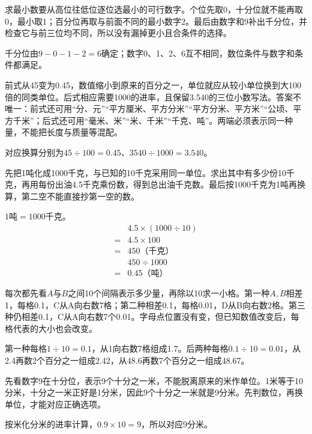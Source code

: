 \documentclass[multi=snippet,border=0pt]{standalone}
\newenvironment{snippet}[3]{\begin{minipage}{#1bp}\color{answerred}\fontsize{#2}{#3}\selectfont\raggedright}{\end{minipage}}
\begin{document}
\begin{snippet}{505}{11.5}{14}求最小数要从高位往低位逐位选最小的可行数字。个位先取0，十分位就不能再取0，最小取1；百分位再取与前面不同的最小数字2。最后由数字和9补出千分位，并检查它与前三位均不同，所以没有漏掉更小且合条件的选择。\par 千分位由\(9-0-1-2=6\)确定；数字0、1、2、6互不相同，数位条件与数字和条件都满足。\end{snippet}
\begin{snippet}{505}{11.5}{14}前式从45变为0.45，数值缩小到原来的百分之一，单位就应从较小单位换到大100倍的同类单位。后式相应需要1000的进率，且保留3.540的三位小数写法。答案不唯一：前式还可用“分、元”“平方厘米、平方分米”“平方分米、平方米”“公顷、平方千米”；后式还可用“毫米、米”“米、千米”“千克、吨”。两端必须表示同一种量，不能把长度与质量等混配。\par 对应换算分别为\(45\div100=0.45\)、\(3540\div1000=3.540\)。\end{snippet}
\begin{snippet}{505}{11.5}{14}先把1吨化成1000千克，与已知的10千克采用同一单位。求出其中有多少份10千克，再用每份出油4.5千克乘份数，得到总出油千克数。最后按1000千克为1吨再换算，第二空不能直接抄第一空的数。\par \(1\text{吨}=1000\text{千克}\)。\[\begin{aligned}&4.5\times(1000\div10)\\={}&4.5\times100\\={}&450\text{（千克）}\\&450\div1000\\={}&0.45\text{（吨）}\end{aligned}\]\end{snippet}
\begin{snippet}{505}{11.5}{14}每次都先看\(A\)与\(B\)之间10个间隔表示多少量，再除以10求一小格。第一种\(A,B\)相差1，每格0.1，C从A向右数7格；第二种相差0.1，每格0.01，D从B向右数2格。第三种仍相差0.1，C从A向右数7个0.01。字母点位置没有变，但已知数值改变后，每格代表的大小也会改变。\par 第一种每格\(1\div10=0.1\)，从1向右数7格组成1.7。后两种每格\(0.1\div10=0.01\)，从2.4再数2个百分之一组成2.42，从48.6再数7个百分之一组成48.67。\end{snippet}
\begin{snippet}{505}{11.5}{14}先看数字9在十分位，表示9个十分之一米，不能脱离原来的米作单位。1米等于10分米，十分之一米正好是1分米，因此9个十分之一米就是9分米。先判数位，再换单位，才能对应正确选项。\par 按米化分米的进率计算，\(0.9\times10=9\)，所以对应9分米。\end{snippet}
\end{document}
